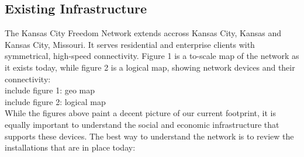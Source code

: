  
\subsection{Existing Infrastructure}
The Kansas City Freedom Network extends accross Kansas City, Kansas and Kansas
City, Missouri. It serves residential and enterprise clients with symmetrical,
high-speed connectivity. Figure 1 is a to-scale map of the network as it exists
today, while figure 2 is a logical map, showing network devices and their
connectivity: \\

include figure 1: geo map\\
include figure 2: logical map\\

While the figures above paint a decent picture of our current footprint, it is
equally important to understand the social and economic
infrastructure that supports these devices. The best way to understand the
network is to review the installations that are in place today:

